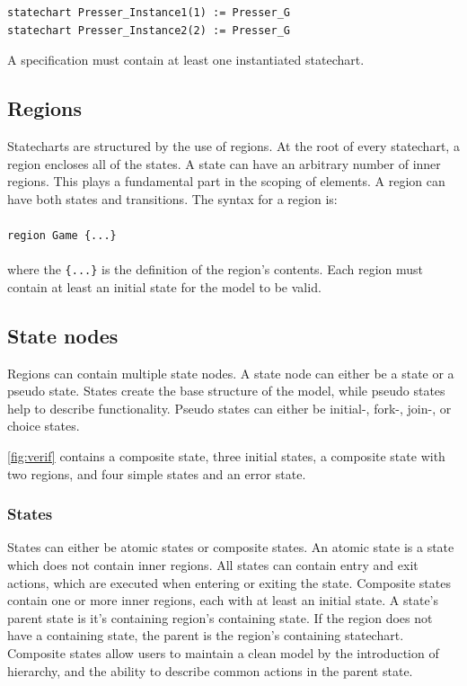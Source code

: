 \begin{lstlisting}
statechart Presser_Instance1(1) := Presser_G
statechart Presser_Instance2(2) := Presser_G
\end{lstlisting}

A specification must contain at least one instantiated statechart.
  \subsection{Regions}
Statecharts are structured by the use of regions. At the root of every statechart, a region encloses all of the states. A state can have an arbitrary number of inner regions. This plays a fundamental part in the scoping of elements. A region can have both states and transitions. The syntax for a region is:
\\\\\verb!region Game {...}!\\\\
where the \verb!{...}! is the definition of the region's contents. Each region must contain at least an initial state for the model to be valid.
  \subsection{State nodes}
Regions can contain multiple state nodes. A state node can either be a state or a pseudo state. States create the base structure of the model, while pseudo states help to describe functionality. Pseudo states can either be initial-, fork-, join-, or choice states.

\cref{fig:verif} contains a composite state, three initial states, a composite state with two regions, and four simple states and an error state.

    \subsubsection{States}
States can either be atomic states or composite states. An atomic state is a state which does not contain inner regions. All states can contain entry and exit actions, which are executed when entering or exiting the state. Composite states contain one or more inner regions, each with at least an initial state. A state's parent state is it's containing region's containing state. If the region does not have a containing state, the parent is the region's containing statechart. Composite states allow users to maintain a clean model by the introduction of hierarchy, and the ability to describe common actions in the parent state.

